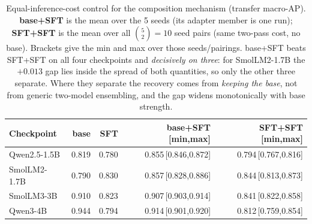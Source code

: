 \begin{table}[H]\centering\small
\caption{Equal-inference-cost control for the composition mechanism (transfer macro-AP). \textbf{base+SFT} is the mean over the 5 seeds (its adapter member is one run); \textbf{SFT+SFT} is the mean over all $\binom{5}{2}=10$ seed pairs (same two-pass cost, no base). Brackets give the min and max over those seeds/pairings. base+SFT beats SFT+SFT on all four checkpoints and \emph{decisively on three}: for SmolLM2-1.7B the $+0.013$ gap lies inside the spread of both quantities, so only the other three separate. Where they separate the recovery comes from \emph{keeping the base}, not from generic two-model ensembling, and the gap widens monotonically with base strength.}
\label{tab:sftsft}
\begin{tabular}{lrrrr}\toprule
Checkpoint & base & SFT & base+SFT [min,max] & SFT+SFT [min,max] \\
\midrule
Qwen2.5-1.5B & 0.819 & 0.780 & 0.855\,[0.846,0.872] & 0.794\,[0.767,0.816] \\
SmolLM2-1.7B & 0.790 & 0.830 & 0.857\,[0.828,0.886] & 0.844\,[0.813,0.873] \\
SmolLM3-3B & 0.910 & 0.823 & 0.907\,[0.903,0.914] & 0.841\,[0.822,0.858] \\
Qwen3-4B & 0.944 & 0.794 & 0.914\,[0.901,0.920] & 0.812\,[0.759,0.854] \\
\bottomrule
\end{tabular}
\end{table}
